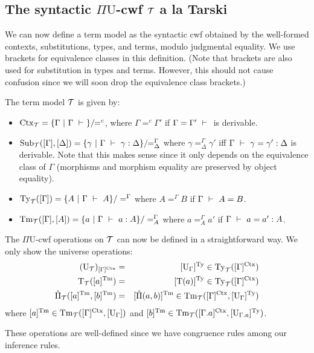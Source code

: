 \documentclass{lmcs}
\def\UU{\mathrm{U}}
\def\Ta{\mathrm{T}}
\def\Pihat{\hat{\Pi}}
\begin{document}
\subsection{The syntactic $\Pi\UU$-cwf ${\mathcal T}$ a la Tarski}
We can now define a term model as the syntactic cwf obtained by the well-formed contexts, substitutions, types, and terms, modulo judgmental equality. We use brackets for equivalence classes in this definition. (Note that brackets are also used for substitution in types and terms. However, this should not cause confusion since we will soon drop the equivalence class brackets.)

\begin{defi}
The term model ${\mathcal T}$ is given by:
\begin{itemize}
\item $\mathrm{Ctx}_{\mathcal T} = \{ {\Gamma}\ |\ \Gamma \ \vdash\  \} /\!\! =^c$, where
  ${\Gamma} =^c {\Gamma}'$ if ${\Gamma} = {\Gamma}' \ \vdash\ $ is
  derivable.
\item
  $\mathrm{Sub}_{\mathcal T}([{\Gamma}],[{\Delta}]) = \{ \gamma\ |\ \Gamma \ \vdash\  \gamma
  : {\Delta} \} /\!\! =^{\Gamma}_{\Delta}$
  where $\gamma =^{\Gamma}_{\Delta} \gamma'$ iff
  ${\Gamma} \ \vdash\  \gamma = \gamma' : {\Delta}$ is derivable. Note that
  this makes sense since it only depends on the equivalence class of
  $\Gamma$ (morphisms and morphism equality are preserved by object
  equality).
\item $\mathrm{Ty}_{\mathcal T}([{\Gamma}]) = \{ A\ |\ \Gamma \ \vdash\  A
  \}/=^{\Gamma}$ where $A =^{\Gamma} B$ if $\Gamma \ \vdash\  A =
  B$.
\item $\Tm_\T([{\Gamma}],[A]) = \{ a\ |\ \Gamma \vdashS a: A\} / =^{\Gamma}_A$ where $a =^{\Gamma}_A
a'$ if $\Gamma \ \vdash\  a = a' : A$. 
\end{itemize}
The $\Pi\UU$-cwf operations on ${\mathcal T}$ can now be defined in a straightforward way. 
We only show the universe operations:
\begin{eqnarray*}
(\UU_\T)_{[\Gamma]^\Ctx} &= &[ \UU_\Gamma ]^\Ty \in \Ty_\T([\Gamma]^\Ctx)\\
\Ta_\T([a]^\Tm) &=& [\Ta(a)]^\Ty \in \Ty_\T([\Gamma]^\Ctx)\\
\Pihat_\T([a]^\Tm,[b]^\Tm) &=& [ \Pihat(a,b) ]^\Tm  \in \Tm_\T([\Gamma]^\Ctx,[\UU_\Gamma]^\Ty)
\end{eqnarray*}
where $[a]^\Tm \in \Tm_\T([\Gamma]^\Ctx,[\UU_\Gamma])$ and $[b]^\Tm \in \Tm_\T([\Gamma.a]^\Ctx,[\UU_{\Gamma.a}]^\Ty)$.

These operations are well-defined since we have congruence rules among our inference rules.
\end{defi}
\end{document}
